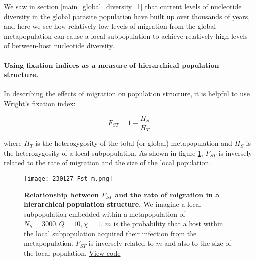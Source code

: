 \documentclass[_main.tex]{subfiles}
\begin{document}
We saw in section \ref{main_global_diversity_1} that current levels of nucleotide diversity in the global parasite population have built up over thousands of years, and here we see how relatively low levels of migration from the global metapopulation can cause a local subpopulation to achieve relatively high levels of between-host nucleotide diversity.  

\paragraph{Using fixation indices as a measure of hierarchical population structure.}  \label{main_fixation_indices}  In describing the effects of migration on population structure, it is helpful to use Wright's fixation index:

\begin{equation*}
F_{ST} = 1 - \frac{H_S}{H_T}
\end{equation*}

where $H_T$ is the heterozygosity of the total (or global) metapopulation and $H_S$ is the heterozygosity of a local subpopulation.  As shown in figure \ref{fig:main_migration_Fst}, $F_{ST}$ is inversely related to the rate of migration and the size of the local population.

\begin{figure}[h!]
\centering
\texttt{[image: 230127\_Fst\_m.png]}
\caption{\textbf{Relationship between $F_{ST}$ and the rate of migration in a hierarchical population structure.}  We imagine a local subpopulation embedded within a metapopulation of $N_h = 3000, Q = 10, \chi = 1$.  $m$ is the probability that a host within the local subpopulation acquired their infection from the metapopulation. $F_{ST}$ is inversely related to $m$ and also to the size of the local population.
\href{https://github.com/d-kwiat/gtg/blob/main/migration_Fst.ipynb}{View code}
}
\label{fig:main_migration_Fst}
\end{figure}
\end{document}
